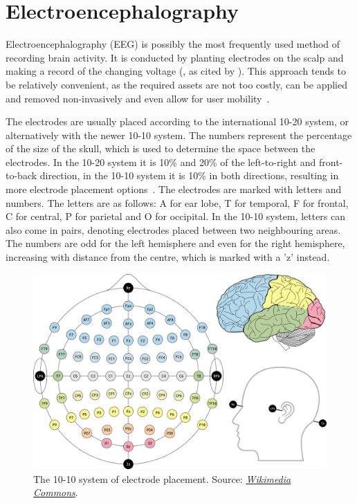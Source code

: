 \documentclass[english, he, bc, kiv, iso690alph]{fasthesis}
\begin{document}
\section{Electroencephalography}

Electroencephalography (EEG) is possibly the most frequently used method of recording brain activity. It is conducted by planting electrodes on the scalp and making a record of the changing voltage (\cite{berger:eeg:29}, as cited by \cite{luck:erp:book}). This approach tends to be relatively convenient, as the required assets are not too costly, can be applied and removed non-invasively and even allow for user mobility~\cite{padfield:bci:19}.

The electrodes are usually placed according to the international 10-20 system, or alternatively with the newer 10-10 system. The numbers represent the percentage of the size of the skull, which is used to determine the space between the electrodes. In the 10-20 system it is 10\% and 20\% of the left-to-right and front-to-back direction, in the 10-10 system it is 10\% in both directions, resulting in more electrode placement options~\cite{acharya:channels:16}. The electrodes are marked with letters and numbers. The letters are as follows: A for ear lobe, T for temporal, F  for frontal, C for central, P for parietal and O for occipital. In the 10-10 system, letters can also come in pairs, denoting electrodes placed between two neighbouring areas. The numbers are odd for the left hemisphere and even for the right hemisphere, increasing with distance from the centre, which is marked with a 'z' instead.

\begin{figure}[h]
	\label{fig:channels}
	\includegraphics[width=\textwidth]{fig/channels.png}
	\caption{The 10-10 system of electrode placement. Source: \href{https://commons.wikimedia.org/wiki/File:EEG_10-10_system_with_additional_information.svg}{\textit{Wikimedia Commons}}.}
\end{figure}
\end{document}
